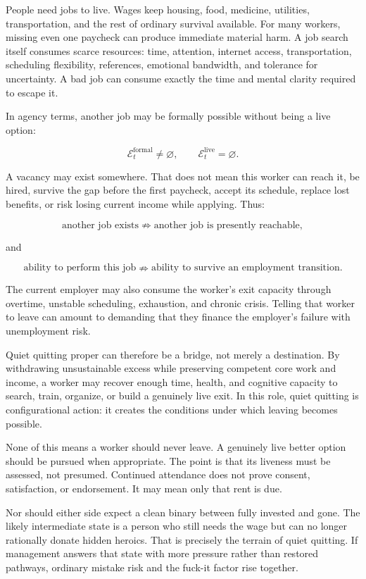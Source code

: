 \documentclass[11pt,oneside]{article}
\begin{document}
People need jobs to live. Wages keep housing, food, medicine, utilities,
transportation, and the rest of ordinary survival available. For many
workers, missing even one paycheck can produce immediate material harm.
A job search itself consumes scarce resources: time, attention, internet
access, transportation, scheduling flexibility, references, emotional
bandwidth, and tolerance for uncertainty. A bad job can consume exactly
the time and mental clarity required to escape it.

In agency terms, another job may be formally possible without being a
live option:

\[
\mathcal E_t^{\mathrm{formal}}\neq\varnothing,
\qquad
\mathcal E_t^{\mathrm{live}}=\varnothing.
\]

A vacancy may exist somewhere. That does not mean this worker can reach
it, be hired, survive the gap before the first paycheck, accept its
schedule, replace lost benefits, or risk losing current income while
applying. Thus:

\[
\text{another job exists}
\nRightarrow
\text{another job is presently reachable},
\]

and

\[
\text{ability to perform this job}
\nRightarrow
\text{ability to survive an employment transition}.
\]

The current employer may also consume the worker's exit capacity through
overtime, unstable scheduling, exhaustion, and chronic crisis. Telling
that worker to leave can amount to demanding that they finance the
employer's failure with unemployment risk.

Quiet quitting proper can therefore be a bridge, not merely a
destination. By withdrawing unsustainable excess while preserving
competent core work and income, a worker may recover enough time, health,
and cognitive capacity to search, train, organize, or build a genuinely
live exit. In this role, quiet quitting is configurational action: it
creates the conditions under which leaving becomes possible.

None of this means a worker should never leave. A genuinely live better
option should be pursued when appropriate. The point is that its
liveness must be assessed, not presumed. Continued attendance does not
prove consent, satisfaction, or endorsement. It may mean only that rent
is due.

Nor should either side expect a clean binary between fully invested and
gone. The likely intermediate state is a person who still needs the wage
but can no longer rationally donate hidden heroics. That is precisely the
terrain of quiet quitting. If management answers that state with more
pressure rather than restored pathways, ordinary mistake risk and the
fuck-it factor rise together.
\end{document}
